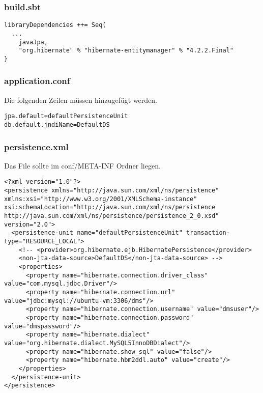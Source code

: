 \documentclass[11pt, a4paper]{article}
\begin{document}
\subsubsection*{build.sbt}

\begin{lstlisting}
libraryDependencies ++= Seq(
  ...
	javaJpa,
	"org.hibernate" % "hibernate-entitymanager" % "4.2.2.Final"
}\end{lstlisting}

\subsubsection*{application.conf}

Die folgenden Zeilen müssen hinzugefügt werden.

\begin{lstlisting}
jpa.default=defaultPersistenceUnit
db.default.jndiName=DefaultDS
\end{lstlisting}

\subsubsection*{persistence.xml}

Das File sollte im conf/META-INF Ordner liegen.

\begin{lstlisting}
<?xml version="1.0"?>
<persistence xmlns="http://java.sun.com/xml/ns/persistence" xmlns:xsi="http://www.w3.org/2001/XMLSchema-instance" xsi:schemaLocation="http://java.sun.com/xml/ns/persistence http://java.sun.com/xml/ns/persistence/persistence_2_0.xsd" version="2.0">
  <persistence-unit name="defaultPersistenceUnit" transaction-type="RESOURCE_LOCAL">
    <!-- <provider>org.hibernate.ejb.HibernatePersistence</provider>
    <non-jta-data-source>DefaultDS</non-jta-data-source> -->
    <properties>
      <property name="hibernate.connection.driver_class" value="com.mysql.jdbc.Driver"/>
      <property name="hibernate.connection.url" value="jdbc:mysql://ubuntu-vm:3306/dms"/>
      <property name="hibernate.connection.username" value="dmsuser"/>
      <property name="hibernate.connection.password" value="dmspassword"/>
      <property name="hibernate.dialect" value="org.hibernate.dialect.MySQL5InnoDBDialect"/>
      <property name="hibernate.show_sql" value="false"/>
      <property name="hibernate.hbm2ddl.auto" value="create"/>
    </properties>
  </persistence-unit>
</persistence>
\end{lstlisting}
\end{document}
